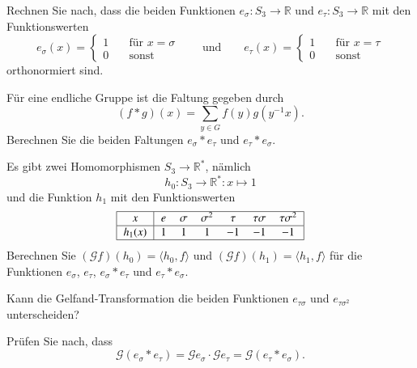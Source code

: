 \begin{teilaufgaben}
\item
Rechnen Sie nach, dass die beiden Funktionen $e_\sigma\colon S_3\to\mathbb{R}$
und $e_\tau\colon S_3\to\mathbb{R}$ mit den Funktionswerten
\[
e_\sigma(x)
=
\begin{cases}
1&\quad \text{für $x=\sigma$}\\
0&\quad \text{sonst}
\end{cases}
\qquad\text{und}\qquad
e_\tau(x)
=
\begin{cases}
1&\quad \text{für $x=\tau$}\\
0&\quad \text{sonst}
\end{cases}
\]
orthonormiert sind.
\item
Für eine endliche Gruppe ist die Faltung gegeben durch
\begin{equation}
(f*g)(x) = \sum_{y\in G} f(y)g(y^{-1}x).
\label{buch:gruppen:301:faltung}
\end{equation}
Berechnen Sie die beiden Faltungen $e_\sigma * e_\tau$ und
$e_\tau* e_\sigma$.
\item
Es gibt zwei Homomorphismen $S_3\to\mathbb{R}^*$, nämlich
\[
h_0\colon S_3 \to \mathbb{R}^* : x \mapsto 1
\]
und die Funktion $h_1$ mit den Funktionswerten
\[
\begin{tabular}{|>{$}c<{$}|>{$}c<{$}>{$}c<{$}>{$}c<{$}>{$}c<{$}>{$}c<{$}>{$}c<{$}|}
\hline
    x &e &\sigma &\sigma^2 &\tau &\tau\sigma &\tau\sigma^2 \\
\hline
h_1(x)&1 &1      &1        &-1   &-1         &-1 \\
\hline
\end{tabular}
\]
Berechnen Sie $(\mathscr{G}f)(h_0)=\langle h_0,f\rangle$
und $(\mathscr{G}f)(h_1)=\langle h_1,f\rangle$
für die Funktionen $e_\sigma$, $e_\tau$, $e_\sigma*e_\tau$
und $e_\tau*e_\sigma$.
\item
Kann die Gelfand-Transformation die beiden Funktionen
$e_{\tau\sigma}$ und $e_{\tau\sigma^2}$ unterscheiden?
\item
Prüfen Sie nach, dass
\[
\mathscr{G}(e_\sigma*e_\tau)
=
\mathscr{G}e_\sigma
\cdot
\mathscr{G}e_\tau
=
\mathscr{G}(e_\tau*e_\sigma).
\]
\end{teilaufgaben}

